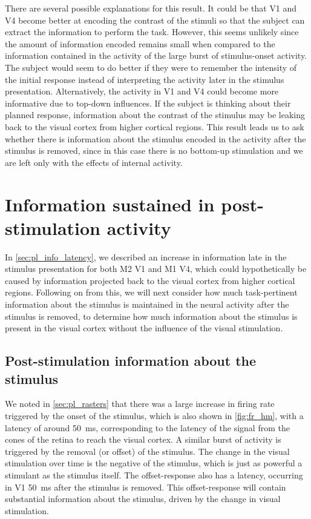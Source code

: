 There are several possible explanations for this result.
It could be that \ac{V1} and \ac{V4} become better at encoding the contrast of the stimuli so that the subject can extract the information to perform the task.
However, this seems unlikely since the amount of information encoded remains small when compared to the information contained in the activity of the large burst of stimulus-onset activity.
The subject would seem to do better if they were to remember the intensity of the initial response instead of interpreting the activity later in the stimulus presentation.
Alternatively, the activity in \ac{V1} and \ac{V4} could become more informative due to top-down influences.
If the subject is thinking about their planned response, information about the contrast of the stimulus may be leaking back to the visual cortex from higher cortical regions.
This result leads us to ask whether there is information about the stimulus encoded in the activity after the stimulus is removed, since in this case there is no bottom-up stimulation and we are left only with the effects of internal activity.


\section{Information sustained in post-stimulation activity}
\label{sec:pl_poststim_info}

In \autoref{sec:pl_info_latency}, we described an increase in information late in the stimulus presentation for both \ac{M2} \ac{V1} and \ac{M1} \ac{V4}, which could hypothetically be caused by information projected back to the visual cortex from higher cortical regions.
Following on from this, we will next consider how much task-pertinent information about the stimulus is maintained in the neural activity after the stimulus is removed, to determine how much information about the stimulus is present in the visual cortex without the influence of the visual stimulation.


\subsection{Post-stimulation information about the stimulus}

We noted in \autoref{sec:pl_rasters} that there was a large increase in firing rate triggered by the onset of the stimulus, which is also shown in \autoref{fig:fr_hm}, with a latency of around \SI{50}{\milli\second}, corresponding to the latency of the signal from the cones of the retina to reach the visual cortex.
A similar burst of activity is triggered by the removal (or offset) of the stimulus.
The change in the visual stimulation over time is the negative of the stimulus, which is just as powerful a stimulant as the stimulus itself.
The offset-response also has a latency, occurring in \ac{V1} \SI{50}{\milli\second} after the stimulus is removed.
This offset-response will contain substantial information about the stimulus, driven by the change in visual stimulation.

